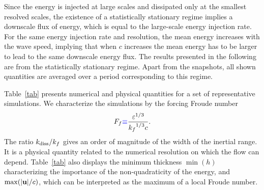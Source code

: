 Since the energy is injected at large scales and dissipated only at
the smallest resolved scales, the existence of a statistically
stationary regime implies a downscale flux of energy, which is equal
to the large-scale energy injection rate.
%
For the same energy injection rate and resolution, the mean energy
increases with the wave speed, implying that when $c$ increases the
mean energy has to be larger to lead to the same downscale energy
flux.
%
The results presented in the following are from the statistically
stationary regime.  Apart from the snapshots, all shown quantities are
averaged over a period corresponding to this regime.



Table~\ref{tab} presents numerical and physical quantities for a set
of representative simulations.
%
We characterize the simulations by the forcing Froude number
\begin{equation}
F_f {\color{blue}\equiv} \frac{\varepsilon^{1/3}}{{k_f}^{1/3}c}.
\end{equation}
%
The ratio $\kdiss/k_f$ gives an order of magnitude of the width of the
inertial range.  It is a physical quantity related to the numerical
resolution on which the flow can depend.
%
Table~\ref{tab} also displays the minimum thickness $\min(h)$
characterizing the importance of the non-quadraticity of the energy,
and $\max(|\textbf{u}|/c)$, which can be interpreted as the maximum of a
local Froude number.




